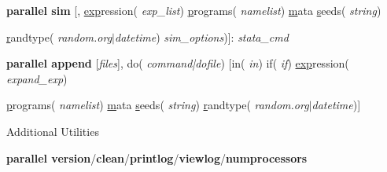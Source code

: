 \documentclass[9pt,\ExtraDocOpts]{beamer}
\begin{document}
\begin{frame}
\begin{semiverbatim}
	\footnotesize
	{\bf parallel sim} [, \uline{exp}ression(\textit{\color{blue} exp\_list}) \uline{p}rograms(\textit{\color{blue} namelist}) \uline{m}ata \uline{s}eeds(\textit{\color{blue} string})
	
	\hspace{1cm} \uline{r}andtype(\textit{\color{blue} random.org$|$datetime}) \textit{sim\_options})]:  \textit{stata\_cmd}
\end{semiverbatim}\pause{}

\begin{semiverbatim}
	\footnotesize
	{\bf parallel append} [\textit{files}], do(\textit{\color{blue} command|dofile}) [in(\textit{\color{blue} in}) if(\textit{\color{blue} if}) \uline{exp}ression(\textit{\color{blue} expand\_exp})
	
	\hspace{1cm} \uline{p}rograms(\textit{\color{blue} namelist}) \uline{m}ata \uline{s}eeds(\textit{\color{blue} string}) \uline{r}andtype(\textit{\color{blue} random.org$|$datetime})]
\end{semiverbatim}\pause{}

Additional Utilities
\begin{semiverbatim}
	\footnotesize
	{\bf parallel version}/{\bf clean}/{\bf printlog}/{\bf viewlog}/{\bf numprocessors}
\end{semiverbatim}

\end{frame}
\end{document}
